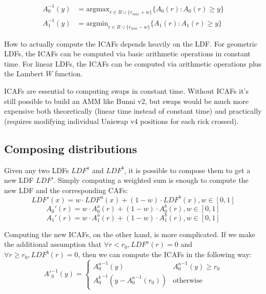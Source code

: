 \documentclass[twocolumn]{article}
\begin{document}
\begin{align}
A_0^{-1}(y) &= \mathrm{argmax}_{r \in R \cup \{r_{max} + w\}} \{A_0(r) : A_0(r) \geq y\} \\
A_1^{-1}(y) &= \mathrm{argmin}_{r \in R \cup \{r_{min} - w\}} \{A_1(r) : A_1(r) \geq y\}
\end{align}

How to actually compute the ICAFs depends heavily on the LDF. For geometric LDFs, the ICAFs can be computed via basic arithmetic operations in constant time. For linear LDFs, the ICAFs can be computed via arithmetic operations plus the Lambert $W$ function.

ICAFs are essential to computing swaps in constant time. Without ICAFs it's still possible to build an AMM like Bunni v2, but swaps would be much more expensive both theoretically (linear time instead of constant time) and practically (requires modifying individual Uniswap v4 positions for each rick crossed). 

\subsection{Composing distributions}

Given any two LDFs $LDF^a$ and $LDF^b$, it is possible to compose them to get a new LDF $LDF'$. Simply computing a weighted sum is enough to compute the new LDF and the corresponding CAFs:  
\begin{equation}
  LDF'(x) = w \cdot LDF^a(x) + (1-w) \cdot LDF^b(x), w \in [0, 1]
\end{equation}
\begin{equation}
  A_0'(r) = w \cdot A_0^a(r) + (1-w) \cdot  A_0^b(r), w \in [0, 1]
\end{equation}
\begin{equation}
  A_1'(r) = w \cdot A_1^a(r) + (1-w) \cdot  A_1^b(r), w \in [0, 1]
\end{equation}

Computing the new ICAFs, on the other hand, is more complicated. If we make the additional assumption that $\forall r < r_0, LDF^a(r)=0$ and $\forall r \ge r_0, LDF^b(r)=0$, then we can compute the ICAFs in the following way:
\begin{equation}
  A'^{-1}_0(y) =
    \begin{cases}
      {A_0^a}^{-1}(y) & {A_0^a}^{-1}(y) \ge r_0\\
      {A_0^b}^{-1}(y - {A_0^a}^{-1}(r_0)) & \text{otherwise} 
    \end{cases}       
\end{equation}
\end{document}
